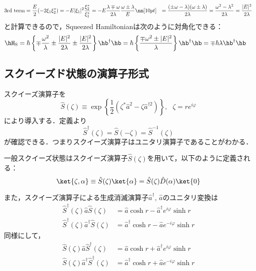 \begin{align}
    {\mathrm{3rd\ term}}
    &=\frac{E}{2}(-2\xi_1\xi_2^{\ast})
    =-E|\xi_1|^2\frac{\xi_2^{\ast}}{\xi_1^{\ast}}
    =-E \frac{\lambda\mp\omega}{2\lambda}\frac{\omega\pm\lambda}{E}\nn[10pt]
    &=\frac{(\pm\omega-\lambda)(\omega\pm\lambda)}{2\lambda}
    =\frac{\omega^2-\lambda^2}{2\lambda}=\frac{|E|^2}{2\lambda}
\end{align}
と計算できるので，Squeezed Hamiltonianは次のように対角化できる：
\begin{align}
    \hH_{\rm{S}}
    &=\hbar\left\{\mp\frac{\omega^2}{\lambda}
    \pm\frac{|E|^2}{2\lambda}
    \pm\frac{|E|^2}{2\lambda}
    \right\}\hb^\dag\hb
    =\hbar\left\{\frac{\mp\omega^2\pm|E|^2}{\lambda}
    \right\}\hb^\dag\hb
    =\mp\hbar\lambda\hb^\dag\hb
\end{align}

\subsection{スクイーズド状態の演算子形式}
スクイーズ演算子を
\begin{equation}
    \hat{S}(\zeta)\equiv
    \exp{
    \left\{
    \frac{1}{2}(\zeta^\ast\hat{a}^2-\zeta\hat{a}^{\dagger 2})
    \right\}
    },\ \ \ \zeta = re^{i\varphi}
\end{equation}
により導入する．定義より
\begin{equation}
    \hat{S}^\dagger(\zeta)=\hat{S}(-\zeta)=\hat{S}^{-1}(\zeta)
\end{equation}
が確認できる．つまりスクイーズ演算子はユニタリ演算子であることがわかる．

一般スクイーズ状態はスクイーズ演算子$\hat{S}(\zeta)$を用いて，以下のように定義される：
\begin{equation}
    \ket{\zeta,\alpha}\equiv\hat{S}(\zeta)\ket{\alpha}
    =\hat{S}(\zeta)\hat{D}(\alpha)\ket{0}
\end{equation}


また，スクイーズ演算子による生成消滅演算子$\hat{a}^\dagger$, $\hat{a}$のユニタリ変換は
\begin{align}
    \hat{S}^\dagger(\zeta)\hat{a}\hat{S}(\zeta)&=
    \hat{a}\cosh{r} - \hat{a}^\dagger e^{i\varphi}\sinh{r}\\[10pt]
    \hat{S}^\dagger(\zeta)\hat{a}^{\dagger}\hat{S}(\zeta)&=
    \hat{a}^\dagger\cosh{r} - \hat{a} e^{-i\varphi}\sinh{r}
\end{align}
同様にして，
\begin{align}
    \hat{S}(\zeta)\hat{a}\hat{S}^\dagger(\zeta)&=
    \hat{a}\cosh{r} + \hat{a}^\dagger e^{i\varphi}\sinh{r}\\[10pt]
    \hat{S}(\zeta)\hat{a}^{\dagger}\hat{S}^\dagger(\zeta)&=
    \hat{a}^\dagger\cosh{r} + \hat{a} e^{-i\varphi}\sinh{r}
\end{align}


